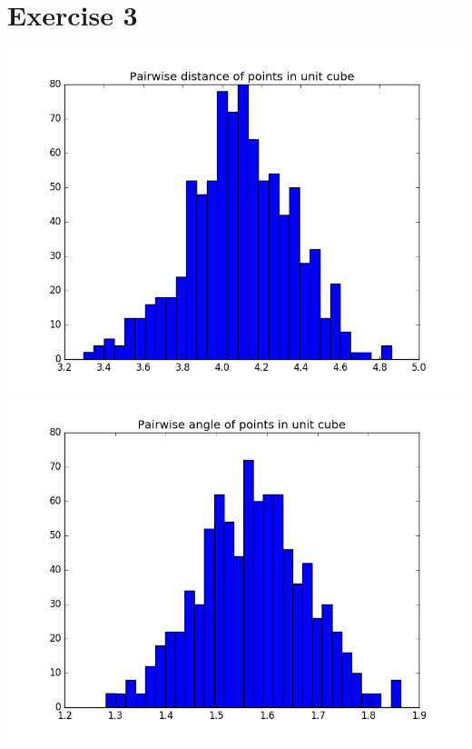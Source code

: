 \documentclass[a4paper,10pt]{article}
\begin{document}
\section*{Exercise 3}
\includegraphics[scale=.4]{c_dist}
\includegraphics[scale=.4]{c_angle}
\end{document}
